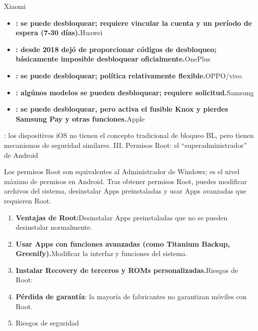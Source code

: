 
Xiaomi

\begin{itemize}
  \item \textbf{: se puede desbloquear; requiere vincular la cuenta y un período de espera (7-30 días).}Huawei
  \item \textbf{: desde 2018 dejó de proporcionar códigos de desbloqueo; básicamente imposible desbloquear oficialmente.}OnePlus
  \item \textbf{: se puede desbloquear; política relativamente flexible.}OPPO/vivo
  \item \textbf{: algúnos modelos se pueden desbloquear; requiere solicitud.}Samsung
  \item \textbf{: se puede desbloquear, pero activa el fusible Knox y pierdes Samsung Pay y otras funciones.}Apple
\end{itemize}

\begin{tcbwarn}{: los dispositivos iOS no tienen el concepto tradicional de bloqueo BL, pero tienen mecanismos de seguridad similares.}
III. Permisos Root: el “superadministrador” de Android

\end{tcbwarn}

\begin{tcbpractice}{Los permisos Root son equivalentes al Administrador de Windows; es el nivel máximo de permisos en Android. Tras obtener permisos Root, puedes modificar archivos del sistema, desinstalar Apps preinstaladas y usar Apps avanzadas que requieren Root.}
\begin{enumerate}
  \item \textbf{Ventajas de Root:}Desinstalar Apps preinstaladas que no se pueden desinstalar normalmente.
  \item \textbf{Usar Apps con funciones avanzadas (como Titanium Backup, Greenify).}Modificar la interfaz y funciones del sistema.
  \item \textbf{Instalar Recovery de terceros y ROMs personalizadas.}Riesgos de Root:
  \item \textbf{Pérdida de garantía}: la mayoría de fabricantes no garantizan móviles con Root.
  \item Riesgos de seguridad
\end{enumerate}

\end{tcbpractice}
